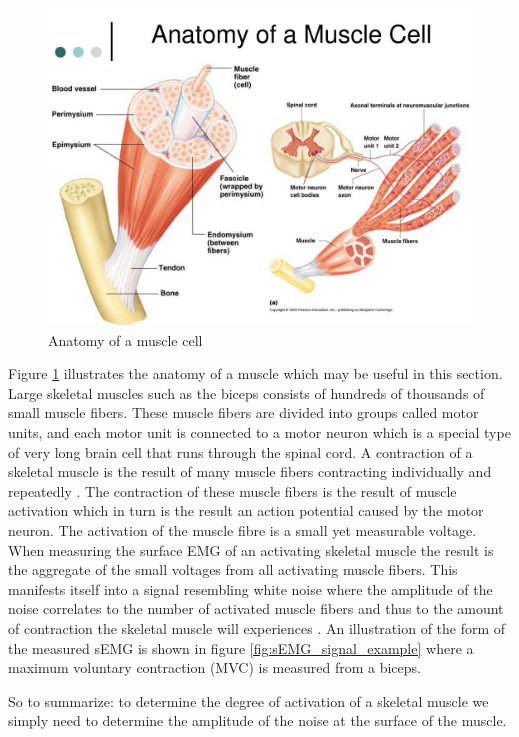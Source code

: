 \begin{figure}[h!t]
	\begin{center}
		\includegraphics[width=0.7\columnwidth]{images/anatomy_of_a_muscle_cell.jpg}
	\end{center}
	\caption{Anatomy of a muscle cell \cite{human_anatomy_physiology}}
	\label{fig:muscle_anatomy}
\end{figure}

Figure \ref{fig:muscle_anatomy} illustrates the anatomy of a muscle which may be useful in this section. 
Large skeletal muscles such as the biceps consists of hundreds of thousands of small muscle fibers. These muscle fibers are divided into groups called motor units, and each motor unit is connected to a motor neuron which is a special type of very long brain cell that runs through the spinal cord. A contraction of a skeletal muscle is the result of many muscle fibers contracting individually and repeatedly \cite{human_anatomy_physiology}. The contraction of these muscle fibers is the result of muscle activation which in turn is the result an action potential caused by the motor neuron. The activation of the muscle fibre is a small yet measurable voltage. When measuring the surface EMG of an activating skeletal muscle the result is the aggregate of the small voltages from all activating muscle fibers. This manifests itself into a signal resembling white noise where the amplitude of the noise correlates to the number of activated muscle fibers and thus to the amount of contraction the skeletal muscle will experiences \cite{optimal_myoprocessor}. An illustration of the form of the measured sEMG is shown in figure \ref{fig:sEMG_signal_example} where a maximum voluntary contraction (MVC) is measured from a biceps.
 
So to summarize: to determine the degree of activation of a skeletal muscle we simply need to determine the amplitude of the noise at the surface of the muscle.

